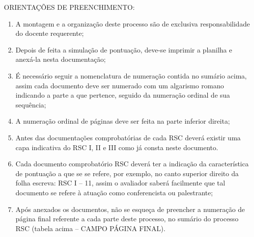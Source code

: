\ifcomentarios
{\color{red}
ORIENTAÇÕES DE PREENCHIMENTO:
\begin{enumerate}
	\itemsep-1em
	\item A montagem e a organização deste processo são de exclusiva responsabilidade do docente requerente;
	\item Depois de feita a simulação de pontuação, deve-se imprimir a planilha e anexá-la nesta documentação;
	\item É necessário seguir a nomenclatura de numeração contida no sumário acima, assim cada documento deve ser numerado com um algarismo romano indicando a parte a que pertence, seguido da numeração ordinal de sua sequência; 
	\item A numeração ordinal de páginas deve ser feita na parte inferior direita;
	\item Antes das documentações comprobatórias de cada RSC deverá existir uma capa indicativa do RSC I, II e III como já consta neste documento.
	\item Cada documento comprobatório RSC deverá ter a indicação da característica de pontuação a que se se refere, por exemplo, no canto superior direito da folha escreva: RSC I – 11, assim o avaliador saberá facilmente que tal documento se refere à atuação como conferencista ou palestrante;
	\item Após anexados os documentos, não se esqueça de preencher a numeração de página final referente a cada parte deste processo, no sumário do processo RSC (tabela acima – CAMPO PÁGINA FINAL).
\end{enumerate}
}
\fi